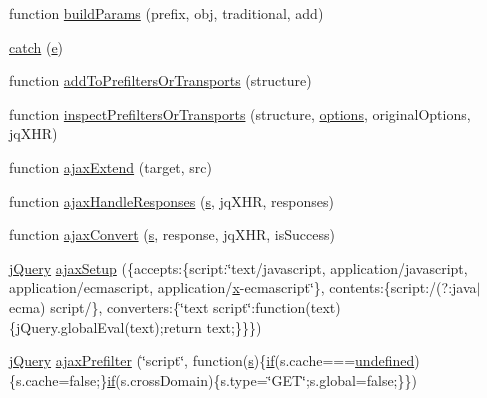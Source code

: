 \begin{DoxyCompactItemize}
\item 
function \hyperlink{obj_2_release_2_package_2_package_tmp_2_scripts_2jquery-1_810_82_8js_a3c4f3b337daa2444fa73ee856be5f9d8}{build\+Params} (prefix, obj, traditional, add)
\item 
\hyperlink{obj_2_release_2_package_2_package_tmp_2_scripts_2jquery-1_810_82_8js_a5bf45fc51bc0426586792b5f9cb95431}{catch} (\hyperlink{_scripts_2respond_8min_8js_a2c038346d47955cbe2cb91e338edd7e1}{e})
\item 
function \hyperlink{obj_2_release_2_package_2_package_tmp_2_scripts_2jquery-1_810_82_8js_ae8bffbac8c6b2208e0ca37b475ec0b70}{add\+To\+Prefilters\+Or\+Transports} (structure)
\item 
function \hyperlink{obj_2_release_2_package_2_package_tmp_2_scripts_2jquery-1_810_82_8js_ac96b244aea80657fe2d6e3d2c1e8b622}{inspect\+Prefilters\+Or\+Transports} (structure, \hyperlink{_scripts_2dropzone_8js_a601a442fa75a5a2657a41da857c71b55}{options}, original\+Options, jq\+X\+H\+R)
\item 
function \hyperlink{obj_2_release_2_package_2_package_tmp_2_scripts_2jquery-1_810_82_8js_a113ade43cfd5328ebd5ccc84f45fe4de}{ajax\+Extend} (target, src)
\item 
function \hyperlink{obj_2_release_2_package_2_package_tmp_2_scripts_2jquery-1_810_82_8js_a71c2db7846f21963cee426cb81003c63}{ajax\+Handle\+Responses} (\hyperlink{_scripts_2respond_8min_8js_ad9a7d92cb87932d25187fdec3ba1b621}{s}, jq\+X\+H\+R, responses)
\item 
function \hyperlink{obj_2_release_2_package_2_package_tmp_2_scripts_2jquery-1_810_82_8js_a549518271b8708165811ae69c274b58a}{ajax\+Convert} (\hyperlink{_scripts_2respond_8min_8js_ad9a7d92cb87932d25187fdec3ba1b621}{s}, response, jq\+X\+H\+R, is\+Success)
\item 
\hyperlink{_scripts_2jquery-1_810_82_8js_a41c2e1bff4a6b292938143764e31d789}{j\+Query} \hyperlink{obj_2_release_2_package_2_package_tmp_2_scripts_2jquery-1_810_82_8js_a52a40924d02e0d9756f051e36a640cd6}{ajax\+Setup} (\{accepts\+:\{script\+:\char`\"{}text/javascript, application/javascript, application/ecmascript, application/\hyperlink{_scripts_2jquery-1_810_82_8min_8js_a5ce50d751c9664d05375c8f5080ed43e}{x}-\/ecmascript\char`\"{}\}, contents\+:\{script\+:/(?\+:java$\vert$ecma) script/\}, converters\+:\{\char`\"{}text script\char`\"{}\+:function(text)\{j\+Query.\+global\+Eval(text);return text;\}\}\})
\item 
\hyperlink{_scripts_2jquery-1_810_82_8js_a41c2e1bff4a6b292938143764e31d789}{j\+Query} \hyperlink{obj_2_release_2_package_2_package_tmp_2_scripts_2jquery-1_810_82_8js_a144939e373cc1ad511a53c4251ec7ffa}{ajax\+Prefilter} (\char`\"{}script\char`\"{}, function(\hyperlink{_scripts_2respond_8min_8js_ad9a7d92cb87932d25187fdec3ba1b621}{s})\{\hyperlink{_scripts_2respond_8min_8js_a93851d60dd037a83509a1757b9ee7b66}{if}(s.\+cache===\hyperlink{_scripts_2jquery-1_810_82_8js_a08113a236cc18d2a9d5ce27e638012be}{undefined})\{s.\+cache=false;\}\hyperlink{_scripts_2respond_8min_8js_a93851d60dd037a83509a1757b9ee7b66}{if}(s.\+cross\+Domain)\{s.\+type=\char`\"{}G\+E\+T\char`\"{};s.\+global=false;\}\})

\end{DoxyCompactItemize}

